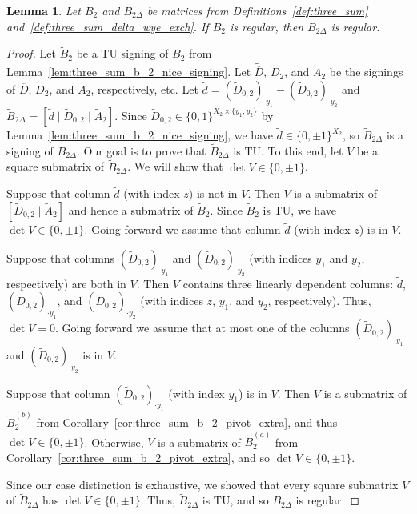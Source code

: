 \documentclass{article}
\newtheorem{lemma}{Lemma}
\theoremstyle{definition}
\begin{document}
\begin{lemma}\label{lem:three_sum_b_2_exch_regular_forward}
    Let $B_{2}$ and $B_{2 \Delta}$ be matrices from Definitions~\ref{def:three_sum} and~\ref{def:three_sum_delta_wye_exch}. If $B_{2}$ is regular, then $B_{2 \Delta}$ is regular.
\end{lemma}

\begin{proof}
    Let $\tilde{B}_{2}$ be a TU signing of $B_{2}$ from Lemma~\ref{lem:three_sum_b_2_nice_signing}. Let $\tilde{\overline{D}}$, $\tilde{D}_{2}$, and $\tilde{A}_{2}$ be the signings of $\overline{D}$, $D_{2}$, and $A_{2}$, respectively, etc. %
    Let $\tilde{d} = (\tilde{D}_{0, 2})_{\cdot y_{1}} - (\tilde{D}_{0, 2})_{\cdot y_{2}}$ and $\tilde{B}_{2 \Delta} = [\tilde{d} \mid \tilde{D}_{0, 2} \mid \tilde{A}_{2}]$. Since $\tilde{D}_{0, 2} \in \{0, 1\}^{X_{2} \times \{y_{1}, y_{2}\}}$ by Lemma~\ref{lem:three_sum_b_2_nice_signing}, we have $\tilde{d} \in \{0, \pm 1\}^{X_{2}}$, so $\tilde{B}_{2 \Delta}$ is a signing of $B_{2 \Delta}$. Our goal is to prove that $\tilde{B}_{2 \Delta}$ is TU. To this end, let $V$ be a square submatrix of $\tilde{B}_{2 \Delta}$. We will show that $\det V \in \{0, \pm 1\}$.

    Suppose that column $\tilde{d}$ (with index $z$) is not in $V$. Then $V$ is a submatrix of $[\tilde{D}_{0, 2} \mid \tilde{A}_{2}]$ and hence a submatrix of $\tilde{B}_{2}$. Since $\tilde{B}_{2}$ is TU, we have $\det V \in \{0, \pm 1\}$. Going forward we assume that column $\tilde{d}$ (with index $z$) is in $V$.

    Suppose that columns $(\tilde{D}_{0, 2})_{\cdot y_{1}}$ and $(\tilde{D}_{0, 2})_{\cdot y_{2}}$ (with indices $y_{1}$ and $y_{2}$, respectively) are both in $V$. Then $V$ contains three linearly dependent columns: $\tilde{d}$, $(\tilde{D}_{0, 2})_{\cdot y_{1}}$, and $(\tilde{D}_{0, 2})_{\cdot y_{2}}$ (with indices $z$, $y_{1}$, and $y_{2}$, respectively). Thus, $\det V = 0$. Going forward we assume that at most one of the columns $(\tilde{D}_{0, 2})_{\cdot y_{1}}$ and $(\tilde{D}_{0, 2})_{\cdot y_{2}}$ is in $V$.

    Suppose that column $(\tilde{D}_{0, 2})_{\cdot y_{1}}$ (with index $y_{1}$) is in $V$. Then $V$ is a submatrix of $\tilde{B}_{2}^{(b)}$ from Corollary~\ref{cor:three_sum_b_2_pivot_extra}, and thus $\det V \in \{0, \pm 1\}$. Otherwise, $V$ is a submatrix of $\tilde{B}_{2}^{(a)}$ from Corollary~\ref{cor:three_sum_b_2_pivot_extra}, and so $\det V \in \{0, \pm 1\}$.

    Since our case distinction is exhaustive, we showed that every square submatrix $V$ of $\tilde{B}_{2 \Delta}$ has $\det V \in \{0, \pm 1\}$. Thus, $\tilde{B}_{2 \Delta}$ is TU, and so $B_{2 \Delta}$ is regular.
\end{proof}
\end{document}
